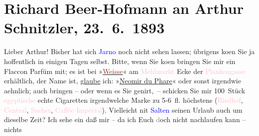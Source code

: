 

               \section[Richard Beer-Hofmann an Arthur Schnitzler, 23. 6. 1893]{ Richard Beer-Hofmann an Arthur Schnitzler, 23. 6. 1893}\nopagebreak{}\rehead{ }\normalsize\beginnumbering{} \toendnotes[C]{\smallbreak\pagebreak[2]} 
\pstart
           \noindent{}{\pb}Lieber Arthur! Bisher
               hat sich \textcolor{blue}{Jarno}{}\ledrightnote{\textcolor{blue}{Josef Jarno}} noch nicht sehen lassen; übrigens
                  ko{\geminationm}en Sie ja hoffentlich in einigen Tagen selbst.
               Bitte, wenn Sie ko{\geminationm}en bringen Sie mir ein Flaccon Parfüm
               mit; es ist bei »\uline{\textcolor{brown}{Weisse}{}\ledrightnote{\textcolor{brown}{Theodor Weisse}}}« am \textcolor{pink}{Mehlmarkt}{}\ledrightnote{\textcolor{pink}{Neuer Markt}} Ecke der \textcolor{pink}{Plankengasse}{}\ledrightnote{\textcolor{pink}{Plankengasse}} erhältlich, der Name ist, \uline{glaube} ich: »\uline{Neomir du
               Phare}« oder sonst irgendwie aehnlich; auch bringen – oder wenn es Sie genirt, – schicken Sie mir 100 Stück \textcolor{pink}{egyptische}{}\ledrightnote{\textcolor{pink}{Ägypten}} echte Cigaretten irgendwelche Marke zu
               5-6 fl. höchstens (\textcolor{pink}{Riedhof}{}\ledrightnote{\textcolor{pink}{Riedhof}}, \textcolor{pink}{Central}{}\ledrightnote{\textcolor{pink}{Café Central}}, \textcolor{pink}{Sacher}{}\ledrightnote{\textcolor{pink}{Hotel Sacher}}, \textcolor{pink}{Caffée Impérial}{}\ledrightnote{\textcolor{pink}{Café Imperial}}). Vielleicht ni{\geminationm}t
                  \textcolor{blue}{Salten}{}\ledrightnote{\textcolor{blue}{Felix Salten}} seinen Urlaub auch um dieselbe Zeit? Ich
               sehe ein daß mir – da ich Euch \textcolor{gray}{d}och nicht nachlaufen kann – nichts
